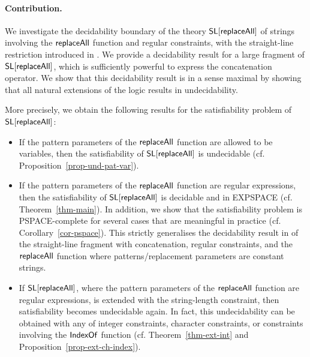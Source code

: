 \paragraph{Contribution.} We investigate the decidability boundary of the theory
$\mathsf{SL}[\mathsf{replaceAll}]$ of strings involving %
the $\mathsf{replaceAll}$ function and regular constraints, with the straight-line
restriction introduced in \cite{LB16}. We provide a decidability result for a 
large fragment of $\mathsf{SL}[\mathsf{replaceAll}]$, which is sufficiently powerful to
express the concatenation operator. We show that this decidability result is in a sense maximal
by showing that all natural extensions of the logic results in undecidability.


More precisely,
we obtain the following results for the satisfiability problem of
$\mathsf{SL}[\mathsf{replaceAll}]$:
\begin{itemize}
\item If the pattern parameters of the $\mathsf{replaceAll}$ function are allowed to be variables, then the satisfiability of $\mathsf{SL}[\mathsf{replaceAll}]$ is undecidable (cf. Proposition~\ref{prop-und-pat-var}).
%
\item If the pattern parameters of the $\mathsf{replaceAll}$ function are regular
    expressions, then the satisfiability of $\mathsf{SL}[\mathsf{replaceAll}]$ is decidable
        and in EXPSPACE (cf. Theorem~\ref{thm-main}). In addition, we show that
        the satisfiability problem is PSPACE-complete for several cases that are
        meaningful in practice (cf. Corollary~\ref{cor-pspace}). This strictly
        generalises the decidability result in \cite{LB16} of the straight-line 
        fragment with concatenation, regular constraints, and the $\mathsf{replaceAll}$ 
        function where
        patterns/replacement parameters are constant strings.
%
\item If $\mathsf{SL}[\mathsf{replaceAll}]$, where the pattern parameters of the
    $\mathsf{replaceAll}$ function are regular expressions, is extended with the 
        string-length constraint, then satisfiability becomes undecidable
        again. In fact, this undecidability can be obtained with
        any of integer constraints, character constraints, or constraints 
        involving the $\mathsf{IndexOf}$ function
        (cf. Theorem~\ref{thm-ext-int} and 
        Proposition~\ref{prop-ext-ch-index}).
\end{itemize}

